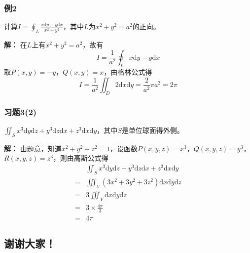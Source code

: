 \documentclass[xetex]{beamer}
\begin{document}
	\begin{frame}
		\frametitle{例2}
		计算$I = \oint_L \frac{x \mathrm{d}y - y\mathrm{d}x}{x^2 + y^2}$，其中$L$为$x^2 + y^2 = a^2$的正向。
		
		\textbf{解：}
			在$L$上有$x^2 + y^2 = a^2$，故有
			\begin{equation*}
				I = \frac{1}{a^2}\oint_L x \mathrm{d}y - y\mathrm{d}x
			\end{equation*}
			取$P(x, y) = -y$，$Q(x, y) = x$，由格林公式得
			\begin{equation*}
				I = \frac{1}{a^2}\iint_D 2 \mathrm{d}x \mathrm{d}y = \frac{2}{a^2}\pi a^2 = 2\pi
			\end{equation*}
	\end{frame}
	\begin{frame}
		\frametitle{习题3(2)}
		$\iint_S x^3 \mathrm{d} y \mathrm{d} z + y^3 \mathrm{d} z \mathrm{d} x + z^3 \mathrm{d} x \mathrm{d} y$，其中$S$是单位球面得外侧。
		
		\textbf{解：}
			由题意，知道$x^2 + y^2 + z^2 = 1$，设函数$P(x, y, z) = x^3$，$Q(x, y, z) = y^3$，$R(x, y, z) = z^3$，则由高斯公式得
			\begin{equation*}
				\begin{split}
				& \iint_S x^3 \mathrm{d} y \mathrm{d} z + y^3 \mathrm{d} z \mathrm{d} x + z^3 \mathrm{d} x \mathrm{d} y \\
		      = & \iiint_V (3x^2 + 3y^2 + 3z^2) \mathrm{d} x \mathrm{d} y \mathrm{d} z \\
			  = & 3 \iiint_V  \mathrm{d} x \mathrm{d} y \mathrm{d} z \\
			  = & 3 \times \frac{4\pi}{3}\\
			  = & 4\pi
				\end{split}
			\end{equation*}
	\end{frame}
	\begin{frame}
		\section{谢谢大家！}
	\end{frame}
\end{document}
